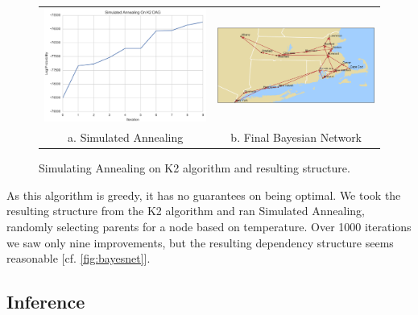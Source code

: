 \documentclass{article}
\begin{document}
\begin{figure}
\centering
\begin{tabular}{cc}
\includegraphics[scale=0.35]{../images/SA_BayesNet.png} & \includegraphics[scale=0.35]{../images/ordering.png} \\
a. Simulated Annealing & b. Final Bayesian Network
\end{tabular}
\caption{Simulating Annealing on K2 algorithm and resulting structure.}
\label{fig:bayesnet}
\end{figure}

As this algorithm is greedy, it has no guarantees on being optimal. We took the resulting structure from the K2 algorithm and ran Simulated Annealing, randomly selecting parents for a node based on temperature. Over 1000 iterations we saw only nine improvements, but the resulting dependency structure seems reasonable [cf. \autoref{fig:bayesnet}].

\subsection{Inference}
\end{document}
